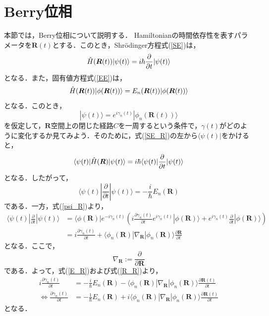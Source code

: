 \documentclass[a4paper, titlepage]{jsreport}
\begin{document}
\section{Berry位相}
本節では，Berry位相について説明する\cite{Berry1984}．
Hamiltonianの時間依存性を表すパラメータを$\bm{R}(t)$とする．このとき，Shr\"{o}dinger方程式(\ref{SE})は，
\begin{equation}
  \Hat{H}(\bm{R}(t)) |\psi(t) \rangle = i\hbar \frac{\partial}{\partial t} |\psi(t) \rangle \label{SE_R}
\end{equation}
となる．また，固有値方程式(\ref{EE})は，
\begin{equation}
  \Hat{H}(\bm{R}(t)) |\phi(\bm{R}(t)) \rangle = E_n(\bm{R}(t)) |\phi(\bm{R}(t)) \rangle \label{EE_R}
\end{equation}
となる．このとき，
\begin{equation}
  |\psi(t) \rangle = e^{i\gamma_n(t)} | \phi_n (\bm{R}(t)) \rangle \label{psi_R}
\end{equation}
を仮定して，$\bm{R}$空間上の閉じた経路$C$を一周するという条件で，$\gamma(t)$がどのように変化するか見てみよう．そのために，式(\ref{SE_R})の左から$\langle \psi(t) |$をかけると，
\begin{equation}
  \langle \psi(t) | \Hat{H}(\bm{R}) |\psi(t) \rangle = i\hbar \langle \psi(t) | \frac{\partial}{\partial t} |\psi(t) \rangle
\end{equation}
となる．したがって，
\begin{equation}
  \langle \psi(t) | \frac{\partial}{\partial t} |\psi(t) \rangle = -\frac{i}{\hbar} E_n(\bm{R})　\label{E_R}
\end{equation}
である．一方，式(\ref{psi_R})より，
\begin{align}
  \langle \psi(t) | \frac{\partial}{\partial t} |\psi(t) \rangle
  &=
  \langle \phi(\bm{R}) | e^{-i\gamma_n(t)} \left( i\frac{\partial \gamma_n(t)}{\partial t} e^{i\gamma_n(t)} |\phi(\bm{R}) \rangle + e^{i\gamma_n(t)} \frac{\partial}{\partial t} |\phi(\bm{R}) \rangle \right)\\
  &= i \frac{\partial \gamma_n(t)}{\partial t} + \langle \phi_n(\bm{R}) | \nabla_{\bm{R}} | \phi_n(\bm{R}) \rangle \frac{\partial \bm{R}}{\partial t} \label{R_R}
\end{align}
となる．ここで，
\begin{equation}
  \nabla_{\bm{R}} := \frac{\partial}{\partial \bm{R}}
\end{equation}
である．よって，式(\ref{E_R})および式(\ref{R_R})より，
\begin{align}
  i \frac{\partial \gamma_n(t)}{\partial t}
  &= 
  -\frac{i}{\hbar} E_n(\bm{R}) - \langle \phi_n(\bm{R}) | \nabla_{\bm{R}} | \phi_n(\bm{R}) \rangle \frac{\partial \bm{R}(t)}{\partial t}\\
  \Leftrightarrow
  \frac{\partial \gamma_n(t)}{\partial t}
  &=
  -\frac{1}{\hbar} E_n(\bm{R}) + i  \langle \phi_n(\bm{R}) | \nabla_{\bm{R}} | \phi_n(\bm{R}) \rangle \frac{\partial \bm{R}(t)}{\partial t}
\end{align}
となる．
\end{document}
